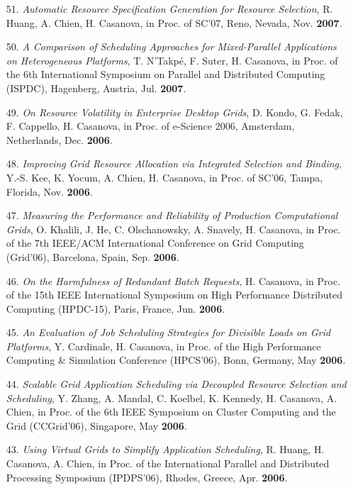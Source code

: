 \begin{enumerate}
\item[51.] {\it Automatic Resource Specification Generation for Resource
Selection},  R. Huang, A. Chien, H. Casanova, in Proc. of SC'07, Reno,
Nevada, Nov. {\bf 2007}.

\item[50.] {\it A Comparison of Scheduling Approaches for Mixed-Parallel Applications on Heterogeneous Platforms},  T. N'Takp\'e, F. Suter, H. Casanova, in Proc. of the 6th International Symposium on Parallel and Distributed Computing (ISPDC), Hagenberg, Austria, 
Jul. {\bf 2007}.

\item[49.] {\it On Resource Volatility in Enterprise Desktop Grids}, D. Kondo, G. Fedak, F. Cappello, H. Casanova, in Proc. of e-Science 2006, Amsterdam,
Netherlands, Dec. {\bf 2006}.

\item[48.] {\it Improving Grid Resource Allocation via Integrated Selection and
Binding}, Y.-S. Kee, K. Yocum, A. Chien, H. Casanova, in Proc. of SC'06,
Tampa, Florida, Nov. {\bf 2006}.

\item[47.] {\it Measuring the Performance and Reliability of Production
Computational Grids}, O. Khalili, J. He, C. Olschanowsky, A. Snavely, H.
Casanova, in Proc. of the 7th IEEE/ACM International Conference on Grid
Computing (Grid'06), Barcelona, Spain, Sep. {\bf 2006}.

\item[46.] {\it On the Harmfulness of Redundant Batch Requests}, H.
Casanova, in Proc. of the 15th IEEE International Symposium on High
Performance Distributed Computing (HPDC-15), Paris, France, Jun. {\bf
2006}.

\item[45.] {\it An Evaluation of Job Scheduling Strategies for Divisible
Loads on Grid Platforms}, Y. Cardinale, H. Casanova, in Proc. of the
High Performance Computing \& Simulation Conference (HPCS'06), Bonn,
Germany, May {\bf 2006}.

\item[44.] {\it Scalable Grid Application Scheduling via Decoupled Resource
Selection and Scheduling}, Y. Zhang, A. Mandal, C. Koelbel, K. Kennedy, H.
Casanova, A.  Chien, in Proc. of the 6th IEEE Symposium on Cluster
Computing and the Grid (CCGrid'06), Singapore, May {\bf 2006}.

\item[43.] {\it Using Virtual Grids to Simplify Application Scheduling},
R. Huang, H. Casanova, A. Chien, in Proc. of the
International Parallel and Distributed Processing Symposium (IPDPS'06),
Rhodes, Greece, Apr. {\bf 2006}.


\end{enumerate}
